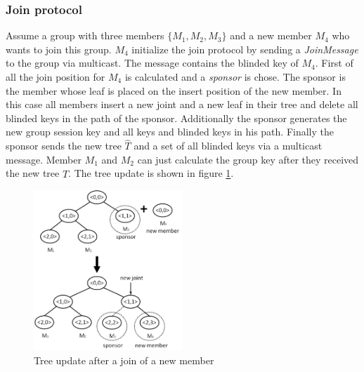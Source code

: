 \subsubsection{Join protocol}
Assume a group with three members $\{M_1, M_2, M_3\}$ and a new member $M_4$ who wants to join this group. $M_4$ initialize the join protocol by sending a \textit{JoinMessage} to the group via multicast. The message contains the blinded key of $M_4$. First of all the join position for $M_4$ is calculated and a \textit{sponsor} is chose. The sponsor is the member whose leaf is placed on the insert position of the new member. In this case all members insert a new joint and a new leaf in their tree and delete all blinded keys in the path of the sponsor. Additionally the sponsor generates the new group session key and all keys and blinded keys in his path. Finally the sponsor sends the new tree $\widehat{T}$ and a set of all blinded keys via a multicast message. Member $M_1$ and $M_2$ can just calculate the group key after they received the new tree $\widehat{T}$. The tree update is shown in figure \ref{fig:tgdh_join}.
\begin{figure}[!h]
\centering\includegraphics[width=0.5\textwidth]{Images/tgdh_join}
\caption{Tree update after a join of a new member}
\label{fig:tgdh_join}
\end{figure}

